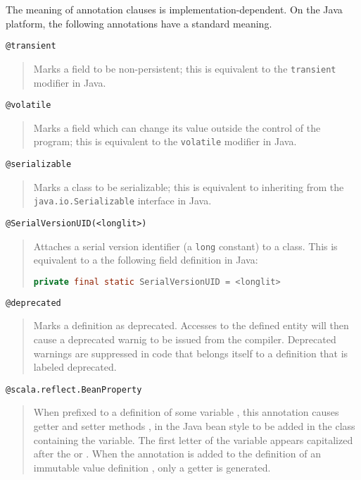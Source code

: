 {The meaning of annotation clauses is implementation-dependent. On the
Java platform, the following annotations have a standard meaning.\bigskip

\lstinline^@transient^
\begin{quote}
Marks a field to be non-persistent; this is
equivalent to the \lstinline^transient^
modifier in Java.
\end{quote}

\lstinline^@volatile^
\begin{quote}Marks a field which can change its value
outside the control of the program; this
is equivalent to the \lstinline^volatile^
modifier in Java.
\end{quote}

\lstinline^@serializable^
\begin{quote}Marks a class to be serializable; this is
equivalent to inheriting from the 
\lstinline^java.io.Serializable^ interface
in Java.
\end{quote}

\lstinline^@SerialVersionUID(<longlit>)^
\begin{quote}Attaches a serial version identifier (a
\lstinline^long^ constant) to a class.
This is equivalent to a the following field
definition in Java:
\begin{lstlisting}[language=Java]
  private final static SerialVersionUID = <longlit> 
\end{lstlisting}
\end{quote}

\lstinline^@deprecated^
\begin{quote} Marks a definition as deprecated. Accesses to the
  defined entity will then cause a
  deprecated warnig to be issued from the compiler.  Deprecated
  warnings are suppressed in code that belongs itself to a definition
  that is labeled deprecated.
\end{quote}

\lstinline^@scala.reflect.BeanProperty^
\begin{quote}
When prefixed to a definition of some variable , this
annotation causes getter and setter methods ,  in
the Java bean style to be added in the class containing the
variable. The first letter of the variable appears capitalized after
the  or . When the annotation is added to the
definition of an immutable value definition , only a getter is
generated.
\end{quote}

}
